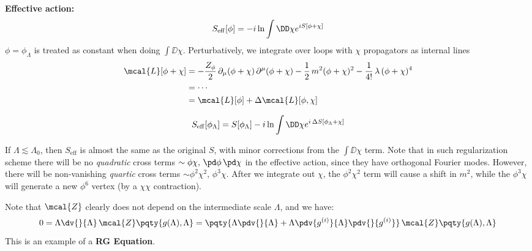 \documentclass[a4paper
	,10pt
]{article}
\begin{document}
	\textbf{Effective action:}
	\begin{equation}
	  S_{\mathrm{eff}}[\phi]
	  = -i \ln \int \DD \chi
	      e^{iS[\phi + \chi]} \\
	\end{equation}
	$\phi = \phi_\Lambda$ is treated as constant when doing
	$\int \DD \chi$. Perturbatively, we integrate over loops with $\chi$ propagators as internal lines
	\begin{equation}
	\begin{aligned}
	  \mcal{L}[\phi + \chi]
	  &= - \frac{Z_\phi}{2}\,
	      \partial_\mu (\phi + \chi)\,
	      \partial^\mu (\phi + \chi)
	    - \frac{1}{2}\, m^2
	      (\phi + \chi)^2
	    - \frac{1}{4!}\, \lambda\,
	      (\phi + \chi)^4\\
	  &= \cdots \\
	  &= \mcal{L}[\phi]
	    + \Delta\mcal{L} [\phi,\chi]
	\end{aligned}
	\end{equation}
	
	\begin{equation}
	  S_{\mathrm{eff}}[\phi_\Lambda]
	  = S[\phi_\Lambda]
	    - i \ln \int \DD \chi
	      e^{i\,\Delta S[\phi_\Lambda + \chi]} \\
	\end{equation}
	
	If $\Lambda \lesssim \Lambda_0$, then $S_{\mathrm{eff}}$ is almost
	the same as the original $S$, with minor corrections from the
	$\int \DD\chi$ term. Note that in such regularization scheme there will be no \textit{quadratic} cross terms $\sim \phi\chi,\, \pd\phi\,\pd\chi$ in the effective action, since they have orthogonal Fourier modes. However, there will be non-vanishing \textit{quartic} cross terms $\sim \phi^2\chi^2,\, \phi^3\chi$. After we integrate out $\chi$, the $\phi^2\chi^2$ term will cause a shift in $m^2$, while the $\phi^3\chi$ will generate a new $\phi^6$ vertex (by a $\chi\chi$ contraction).
	
	Note that $\mcal{Z}$ clearly does not depend on the intermediate scale $\Lambda$, and we have:
	\begin{equation}
	  0
	  = \Lambda \dv{}{\Lambda}\,
	    \mcal{Z}\pqty{g(\Lambda),\Lambda}
	  = \pqty{
	      \Lambda \pdv{}{\Lambda}
	      + \Lambda \pdv{g^{(i)}}{\Lambda}
	        \pdv{}{g^{(i)}}
	    }\,
	    \mcal{Z}\pqty{g(\Lambda),\Lambda}
	\end{equation}
	This is an example of a \textbf{RG Equation}.
\end{document}
